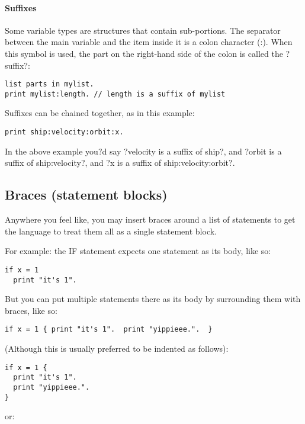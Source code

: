 \paragraph{Suffixes}
Some variable types are structures that contain sub-portions. The separator between the main variable and the item inside it is a colon character (:). When this symbol is used, the part on the right-hand side of the colon is called the ?suffix?:

\begin{Verbatim}[frame=single]
list parts in mylist.
print mylist:length. // length is a suffix of mylist
\end{Verbatim}

Suffixes can be chained together, as in this example:

\begin{Verbatim}[frame=single]
print ship:velocity:orbit:x.
\end{Verbatim}

In the above example you?d say ?velocity is a suffix of ship?, and ?orbit is a suffix of ship:velocity?, and ?x is a suffix of ship:velocity:orbit?.

\subsection{Braces (statement blocks)}
Anywhere you feel like, you may insert braces around a list of statements to get the language to treat them all as a single statement block.

For example: the IF statement expects one statement as its body, like so:

\begin{Verbatim}[frame=single]
if x = 1
  print "it's 1".
\end{Verbatim}

But you can put multiple statements there as its body by surrounding them with braces, like so:

\begin{Verbatim}[frame=single]
if x = 1 { print "it's 1".  print "yippieee.".  }
\end{Verbatim}

(Although this is usually preferred to be indented as follows):

\begin{Verbatim}[frame=single]
if x = 1 {
  print "it's 1".
  print "yippieee.".
}
\end{Verbatim}

or:

